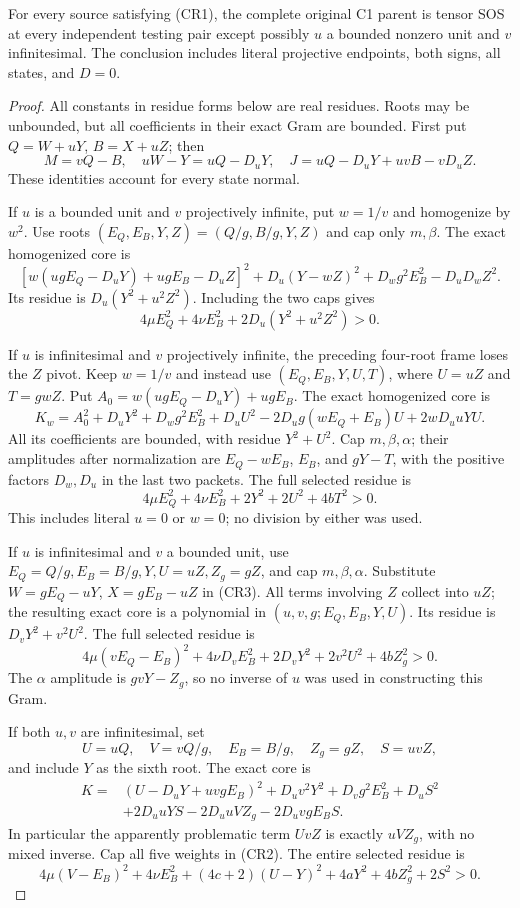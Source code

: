 \begin{theorem}
For every source satisfying (CR1), the complete original C1 parent
is tensor SOS at every independent testing pair except possibly
$u$ a bounded nonzero unit and $v$ infinitesimal. The conclusion
includes literal projective endpoints, both signs, all states,
and $D=0$.
\end{theorem}
\begin{proof}
All constants in residue forms below are real residues. Roots may be
unbounded, but all coefficients in their exact Gram are bounded.
First put $Q=W+uY$, $B=X+uZ$; then
\[
 M=vQ-B,\quad uW-Y=uQ-D_uY,\quad
 J=uQ-D_uY+uvB-vD_uZ.                               \tag{CR4}
\]
These identities account for every state normal.

If $u$ is a bounded unit and $v$ projectively infinite, put $w=1/v$
and homogenize by $w^2$. Use roots
$(E_Q,E_B,Y,Z)=(Q/g,B/g,Y,Z)$ and cap only $m,\beta$.
The exact homogenized core is
\[
 [w(ugE_Q-D_uY)+ugE_B-D_uZ]^2
 +D_u(Y-wZ)^2+D_wg^2E_B^2-D_uD_wZ^2.
\]
Its residue is $D_u(Y^2+u^2Z^2)$. Including the two caps gives
\[
 4\mu E_Q^2+4\nu E_B^2+2D_u(Y^2+u^2Z^2)>0.         \tag{CR5}
\]

If $u$ is infinitesimal and $v$ projectively infinite, the preceding
four-root frame loses the $Z$ pivot. Keep $w=1/v$ and instead use
$(E_Q,E_B,Y,U,T)$, where $U=uZ$ and $T=gwZ$. Put
$A_0=w(ugE_Q-D_uY)+ugE_B$. The exact homogenized core is
\[
 K_w=A_0^2+D_uY^2+D_wg^2E_B^2+D_uU^2
       -2D_ug(wE_Q+E_B)U+2wD_uuYU.
\]
All its coefficients are bounded, with residue $Y^2+U^2$.
Cap $m,\beta,\alpha$; their amplitudes after normalization are
$E_Q-wE_B$, $E_B$, and $gY-T$, with the positive factors
$D_w,D_u$ in the last two packets. The full selected residue is
\[
 4\mu E_Q^2+4\nu E_B^2+2Y^2+2U^2+4bT^2>0.       \tag{CR5a}
\]
This includes literal $u=0$ or $w=0$; no division by either was used.

If $u$ is infinitesimal and $v$ a bounded unit, use
$E_Q=Q/g,E_B=B/g,Y,U=uZ,Z_g=gZ$, and cap $m,\beta,\alpha$.
Substitute $W=gE_Q-uY$, $X=gE_B-uZ$ in (CR3).
All terms involving $Z$ collect into $uZ$; the resulting exact
core is a polynomial in $(u,v,g;E_Q,E_B,Y,U)$.
Its residue is $D_vY^2+v^2U^2$. The full selected residue is
\[
 4\mu(vE_Q-E_B)^2+4\nu D_vE_B^2
       +2D_vY^2+2v^2U^2+4bZ_g^2>0.                 \tag{CR6}
\]
The $\alpha$ amplitude is $gvY-Z_g$, so no inverse of $u$ was used
in constructing this Gram.

If both $u,v$ are infinitesimal, set
\[
 U=uQ,\quad V=vQ/g,\quad E_B=B/g,\quad Z_g=gZ,
 \quad S=uvZ,
\]
and include $Y$ as the sixth root. The exact core is
\begin{align*}
K={}&(U-D_uY+uvgE_B)^2+D_uv^2Y^2+D_vg^2E_B^2+D_uS^2\\
 &+2D_uuYS-2D_uuVZ_g-2D_uvgE_BS.                 \tag{CR7}
\end{align*}
In particular the apparently problematic term $UvZ$ is exactly
$uVZ_g$, with no mixed inverse. Cap all five weights in (CR2).
The entire selected residue is
\[
 4\mu(V-E_B)^2+4\nu E_B^2+(4c+2)(U-Y)^2
          +4aY^2+4bZ_g^2+2S^2>0.                  \tag{CR8}
\]


\end{proof}
